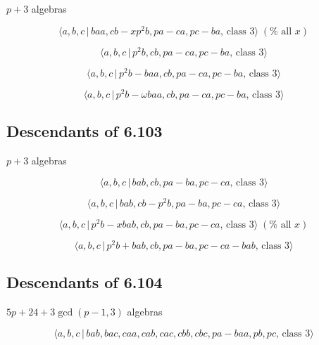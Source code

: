 \documentclass[10pt]{article}
\begin{document}
$p+3$ algebras

\begin{equation}
\langle a,b,c\,|\,baa,cb-xp^2b,pa-ca,pc-ba,\,\text{class }3\rangle \;(\text{%
all }x)  \tag{7.1180}
\end{equation}

\begin{equation}
\langle a,b,c\,|\,p^2b,cb,pa-ca,pc-ba,\,\text{class }3\rangle  \tag{7.1181}
\end{equation}

\begin{equation}
\langle a,b,c\,|\,p^2b-baa,cb,pa-ca,pc-ba,\,\text{class }3\rangle 
\tag{7.1182}
\end{equation}

\begin{equation}
\langle a,b,c\,|\,p^{2}b-\omega baa,cb,pa-ca,pc-ba,\,\text{class }3\rangle 
\tag{7.1183}
\end{equation}

\subsection{Descendants of 6.103}

$p+3$ algebras

\begin{equation}
\langle a,b,c\,|\,bab,cb,pa-ba,pc-ca,\,\text{class }3\rangle  \tag{7.1184}
\end{equation}

\begin{equation}
\langle a,b,c\,|\,bab,cb-p^2b,pa-ba,pc-ca,\,\text{class }3\rangle 
\tag{7.1185}
\end{equation}

\begin{equation}
\langle a,b,c\,|\,p^2b-xbab,cb,pa-ba,pc-ca,\,\text{class }3\rangle \;(\text{%
all }x)  \tag{7.1186}
\end{equation}

\begin{equation}
\langle a,b,c\,|\,p^2b+bab,cb,pa-ba,pc-ca-bab,\,\text{class }3\rangle 
\tag{7.1187}
\end{equation}

\subsection{Descendants of 6.104}

$5p+24+3\gcd (p-1,3)$ algebras

\begin{equation}
\langle a,b,c\,|\,bab,bac,caa,cab,cac,cbb,cbc,pa-baa,pb,pc,\,\text{class }%
3\rangle  \tag{7.1188}
\end{equation}
\end{document}
